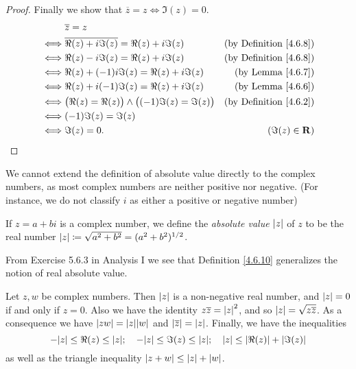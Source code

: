 \begin{proof}
    Finally we show that \(\overline{z} = z \iff \Im(z) = 0\).
    \begin{align*}
             & \overline{z} = z                                                                                    \\
        \iff & \overline{\Re(z) + i \Im(z)} = \Re(z) + i \Im(z)               & \text{(by Definition \ref{4.6.8})} \\
        \iff & \Re(z) - i \Im(z) = \Re(z) + i \Im(z)                          & \text{(by Definition \ref{4.6.8})} \\
        \iff & \Re(z) + (-1) i \Im(z) = \Re(z) + i \Im(z)                     & \text{(by Lemma \ref{4.6.7})}      \\
        \iff & \Re(z) + i (-1) \Im(z) = \Re(z) + i \Im(z)                     & \text{(by Lemma \ref{4.6.6})}      \\
        \iff & \big(\Re(z) = \Re(z)\big) \land \big((-1) \Im(z) = \Im(z)\big) & \text{(by Definition \ref{4.6.2})} \\
        \iff & (-1) \Im(z) = \Im(z)                                                                                \\
        \iff & \Im(z) = 0.                                                    & (\Im(z) \in \mathbf{R})
    \end{align*}
\end{proof}

\begin{note}
    We cannot extend the definition of absolute value directly to the complex numbers, as most complex numbers are neither positive nor negative.
    (For instance, we do not classify \(i\) as either a positive or negative number)
\end{note}

\begin{definition}\label{4.6.10}
    If \(z = a + bi\) is a complex number, we define the \emph{absolute value} \(\left\lvert z\right\rvert\) of \(z\) to be the real number \(\left\lvert z\right\rvert \coloneqq \sqrt{a^2 + b^2} = (a^2 + b^2)^{1 / 2}\).
\end{definition}

\begin{note}
    From Exercise 5.6.3 in Analysis I we see that Definition \ref{4.6.10} generalizes the notion of real absolute value.
\end{note}

\begin{lemma}\label{4.6.11}
    Let \(z, w\) be complex numbers.
    Then \(\left\lvert z\right\rvert\) is a non-negative real number, and \(\left\lvert z\right\rvert = 0\) if and only if \(z = 0\).
    Also we have the identity \(z \overline{z} = \left\lvert z\right\rvert^2\), and so \(\left\lvert z\right\rvert = \sqrt{z \overline{z}}\).
    As a consequence we have \(\abs{zw} = \abs{z} \abs{w}\) and \(\left\lvert\overline{z}\right\rvert = \left\lvert z\right\rvert\).
    Finally, we have the inequalities
    \[
        -\abs{z} \leq \Re(z) \leq \abs{z}; \quad -\abs{z} \leq \Im(z) \leq \abs{z}; \quad \abs{z} \leq \abs{\Re(z)} + \abs{\Im(z)}
    \]
    as well as the triangle inequality \(\left\lvert z + w\right\rvert \leq \left\lvert z\right\rvert + \left\lvert w\right\rvert\).
\end{lemma}

